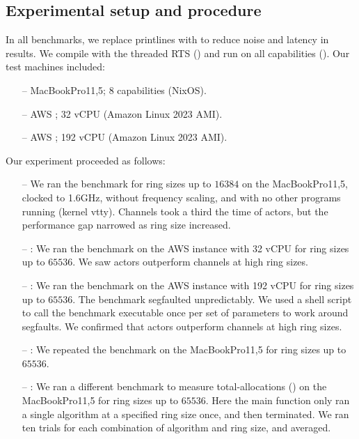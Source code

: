 \documentclass[sigplan,screen]{acmart}
\begin{document}
\subsection{Experimental setup and procedure}
\label{apx:exp-setup}

In all benchmarks, we replace printlines with 
to reduce noise and latency in results.
We compile with the threaded RTS () and run on all capabilities
().
Our test machines included:
%
\begin{itemize}[leftmargin=1em]
    \item[--] MacBookPro11,5; 8 capabilities (NixOS).
    \item[--] AWS ; 32 vCPU (Amazon Linux 2023 AMI).
    \item[--] AWS ; 192 vCPU (Amazon Linux 2023 AMI).
\end{itemize}
%
Our experiment proceeded as follows:
%
\begin{itemize}[leftmargin=1em]
    \item[--] We ran the  benchmark for ring sizes up to
    $16384$ on the MacBookPro11,5, clocked to 1.6GHz, without
    frequency scaling, and with no other programs running (kernel vtty).
    Channels took a third the time of actors, but
    the performance gap narrowed as ring size increased.

    \item[--] :
    We ran the benchmark on the AWS  instance with 32 vCPU
    for ring sizes up to $65536$.
    We saw actors outperform channels at high ring sizes.

    \item[--] :
    We ran the benchmark on the AWS  instance with 192 vCPU
    for ring sizes up to $65536$.
    The benchmark segfaulted unpredictably.
    We used a shell script to call the benchmark executable once per set of
    parameters to work around segfaults.
    We confirmed that actors outperform channels at high ring sizes.

    \item[--] :
    We repeated the benchmark on the MacBookPro11,5
    for ring sizes up to $65536$.

    \item[--] :
    We ran a different benchmark
    to measure total-allocations ()
    on the MacBookPro11,5
    for ring sizes up to $65536$.
    Here the main function only ran a single algorithm at a
    specified ring size once, and then terminated.
    We ran ten trials for each combination of algorithm and ring size, and averaged.
\end{itemize}
\end{document}
